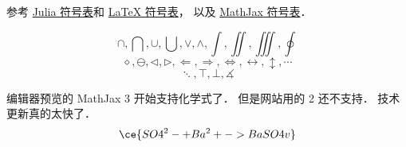 
参考 \href{https://docs.julialang.org/en/v1/manual/unicode-input/}{Julia 符号表}和 \href{https://oeis.org/wiki/List_of_LaTeX_mathematical_symbols}{LaTeX 符号表}， 以及 \href{http://www.onemathematicalcat.org/MathJaxDocumentation/TeXSyntax.htm#U}{MathJax 符号表}．

\begin{equation}
\cap, \bigcap, \cup, \bigcup, \vee, \wedge, \int, \iint, \iiint, \oint
\end{equation}
\begin{equation}
\diamond, \ominus, \triangleleft, \triangleright, \Longleftarrow, \Longrightarrow, \iff, \leftrightarrow, \updownarrow, \cdots
\end{equation}
\begin{equation}
\ddots, \top, \bot, \measuredangle
\end{equation}

编辑器预览的 MathJax 3 开始支持化学式了． 但是网站用的 2 还不支持． 技术更新真的太快了．
\begin{equation}
\ce{SO4^2- + Ba^2+ -> BaSO4 v}
\end{equation}
